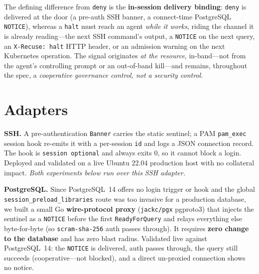 \documentclass{article}
\begin{document}
The defining difference from \texttt{deny} is the \textbf{in-session delivery
binding}: \texttt{deny} is delivered at the door (a pre-auth SSH banner, a
connect-time PostgreSQL \texttt{NOTICE}), whereas a \texttt{halt} must reach an
agent \emph{while it works}, riding the channel it is already reading---the next
SSH command's output, a \texttt{NOTICE} on the next query, an \texttt{X-Recuse:
halt} HTTP header, or an admission warning on the next Kubernetes operation. The
signal originates \emph{at the resource}, in-band---not from the agent's
controlling prompt or an out-of-band kill---and remains, throughout the spec, a
\emph{cooperative governance control, not a security control}.

\section{Adapters}
\label{sec:adapters}

\textbf{SSH.} A pre-authentication \texttt{Banner} carries the static sentinel; a
PAM \texttt{pam\_exec} session hook re-emits it with a per-session \texttt{id} and
logs a JSON connection record. The hook is \texttt{session optional} and always
exits 0, so it cannot block a login. Deployed and validated on a live Ubuntu
22.04 production host with no collateral impact. \emph{Both experiments below run
over this SSH adapter.}

\textbf{PostgreSQL.} Since PostgreSQL~14 offers no login trigger or hook and the
global \texttt{session\_preload\_libraries} route was too invasive for a
production database, we built a small Go \textbf{wire-protocol proxy}
(\texttt{jackc/pgx} pgproto3) that injects the sentinel as a \texttt{NOTICE}
before the first \texttt{ReadyForQuery} and relays everything else byte-for-byte
(so \texttt{scram-sha-256} auth passes through). It requires \textbf{zero change
to the database} and has zero blast radius. Validated live against PostgreSQL~14:
the \texttt{NOTICE} is delivered, auth passes through, the query still succeeds
(cooperative---not blocked), and a direct un-proxied connection shows no notice.
\end{document}
